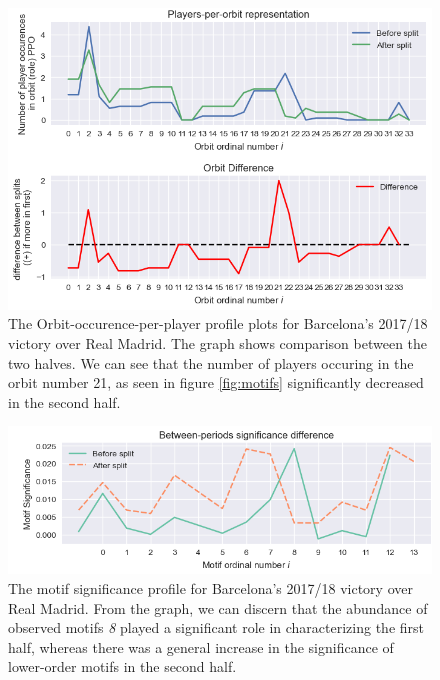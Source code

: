 \documentclass[9pt,twocolumn,twoside]{pnas-report}
\begin{document}
\begin{figure}[t]\centering
	\includegraphics[width=\linewidth]{barcaopp.png}
	\caption{The Orbit-occurence-per-player profile plots for Barcelona's 2017/18 victory over Real Madrid. The graph shows comparison between the two halves. We can see that the number of players occuring in the orbit number 21, as seen in figure \ref{fig:motifs} significantly decreased in the second half.}
	\label{fig:BarcaOPP}
\end{figure}


\begin{figure}[t]\centering
	\includegraphics[width=\linewidth]{barcasignif.png}
	\caption{The motif significance profile for Barcelona's 2017/18 victory over Real Madrid. From the graph, we can discern that the abundance of observed motifs \textit{8} played a significant role in characterizing the first half, whereas there was a general increase in the significance of lower-order motifs in the second half.}
	\label{fig:Barca Significance}
\end{figure}
\end{document}
